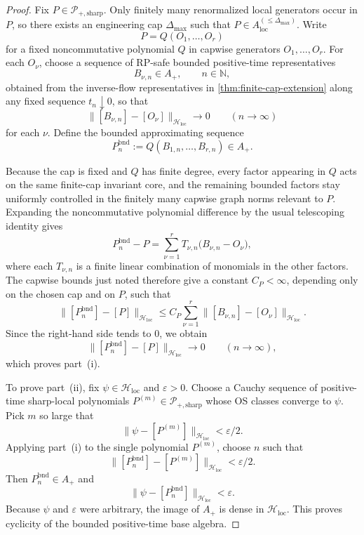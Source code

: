 \begin{proof}
Fix $P\in\mathcal P_{+,\mathrm{sharp}}$. Only finitely many renormalized local generators occur in $P$, so there exists an engineering cap $\Delta_{\max}$ such that $P\in A_{\mathrm{loc}}^{(\le \Delta_{\max})}$. Write
\[
P=Q(O_1,\dots,O_r)
\]
for a fixed noncommutative polynomial $Q$ in capwise generators $O_1,\dots,O_r$. For each $O_\nu$, choose a sequence of RP-safe bounded positive-time representatives
\[
B_{\nu,n}\in A_+,\qquad n\in\mathbb N,
\]
obtained from the inverse-flow representatives in \cref{thm:finite-cap-extension} along any fixed sequence $t_n\downarrow 0$, so that
\[
\|[B_{\nu,n}]-[O_\nu]\|_{\mathcal H_{\mathrm{loc}}}\longrightarrow 0\qquad (n\to\infty)
\]
for each $\nu$. Define the bounded approximating sequence
\[
P_n^{\mathrm{bnd}}:=Q(B_{1,n},\dots,B_{r,n})\in A_+.
\]

Because the cap is fixed and $Q$ has finite degree, every factor appearing in $Q$ acts on the same finite-cap invariant core, and the remaining bounded factors stay uniformly controlled in the finitely many capwise graph norms relevant to $P$. Expanding the noncommutative polynomial difference by the usual telescoping identity gives
\[
P_n^{\mathrm{bnd}}-P=\sum_{\nu=1}^r T_{\nu,n}\bigl(B_{\nu,n}-O_\nu\bigr),
\]
where each $T_{\nu,n}$ is a finite linear combination of monomials in the other factors. The capwise bounds just noted therefore give a constant $C_P<\infty$, depending only on the chosen cap and on $P$, such that
\[
\|[P_n^{\mathrm{bnd}}]-[P]\|_{\mathcal H_{\mathrm{loc}}}
\le C_P\sum_{\nu=1}^r \|[B_{\nu,n}]-[O_\nu]\|_{\mathcal H_{\mathrm{loc}}}.
\]
Since the right-hand side tends to $0$, we obtain
\[
\|[P_n^{\mathrm{bnd}}]-[P]\|_{\mathcal H_{\mathrm{loc}}}\longrightarrow 0\qquad (n\to\infty),
\]
which proves part~\textup{(i)}.

To prove part~\textup{(ii)}, fix $\psi\in\mathcal H_{\mathrm{loc}}$ and $\varepsilon>0$. Choose a Cauchy sequence of positive-time sharp-local polynomials $P^{(m)}\in\mathcal P_{+,\mathrm{sharp}}$ whose OS classes converge to $\psi$. Pick $m$ so large that
\[
\|\psi-[P^{(m)}]\|_{\mathcal H_{\mathrm{loc}}}<\varepsilon/2.
\]
Applying part~\textup{(i)} to the single polynomial $P^{(m)}$, choose $n$ such that
\[
\|[P_n^{\mathrm{bnd}}]-[P^{(m)}]\|_{\mathcal H_{\mathrm{loc}}}<\varepsilon/2.
\]
Then $P_n^{\mathrm{bnd}}\in A_+$ and
\[
\|\psi-[P_n^{\mathrm{bnd}}]\|_{\mathcal H_{\mathrm{loc}}}<\varepsilon.
\]
Because $\psi$ and $\varepsilon$ were arbitrary, the image of $A_+$ is dense in $\mathcal H_{\mathrm{loc}}$. This proves cyclicity of the bounded positive-time base algebra.


\end{proof}
